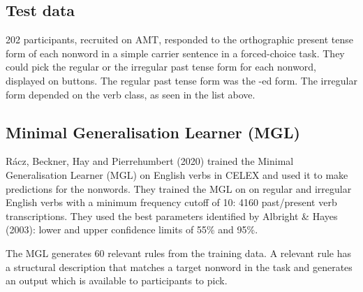 \documentclass[
]{article}
\begin{document}
\hypertarget{test-data}{%
\subsection{Test data}\label{test-data}}

202 participants, recruited on AMT, responded to the orthographic
present tense form of each nonword in a simple carrier sentence in a
forced-choice task. They could pick the regular or the irregular past
tense form for each nonword, displayed on buttons. The regular past
tense form was the -ed form. The irregular form depended on the verb
class, as seen in the list above.

\hypertarget{minimal-generalisation-learner-mgl}{%
\subsection{Minimal Generalisation Learner
(MGL)}\label{minimal-generalisation-learner-mgl}}

Rácz, Beckner, Hay and Pierrehumbert (2020) trained the Minimal
Generalisation Learner (MGL) on English verbs in CELEX and used it to
make predictions for the nonwords. They trained the MGL on on regular
and irregular English verbs with a minimum frequency cutoff of 10: 4160
past/present verb transcriptions. They used the best parameters
identified by Albright \& Hayes (2003): lower and upper confidence
limits of 55\% and 95\%.

The MGL generates 60 relevant rules from the training data. A relevant
rule has a structural description that matches a target nonword in the
task and generates an output which is available to participants to pick.
\end{document}
